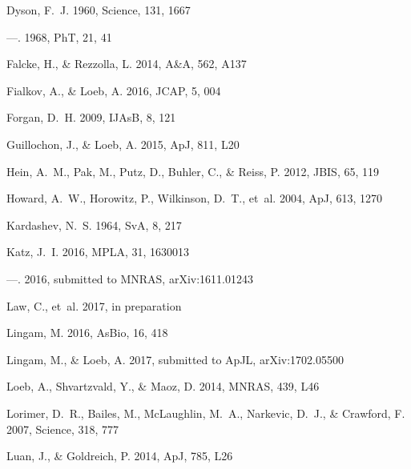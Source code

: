 \documentclass[twocolumn,tighten]{aastex61}
\begin{document}
\begin{thebibliography}{}
{Dyson}, F.~J. 1960, Science, 131, 1667

---. 1968, PhT, 21, 41

{Falcke}, H., \& {Rezzolla}, L. 2014, A\&A, 562, A137

{Fialkov}, A., \& {Loeb}, A. 2016, JCAP, 5, 004

{Forgan}, D.~H. 2009, IJAsB, 8, 121

{Guillochon}, J., \& {Loeb}, A. 2015, ApJ, 811, L20

{Hein}, A.~M., {Pak}, M., {Putz}, D., {Buhler}, C., \& {Reiss}, P. 2012, JBIS,
  65, 119

{Howard}, A.~W., {Horowitz}, P., {Wilkinson}, D.~T., {et~al.} 2004, ApJ, 613,
  1270

{Kardashev}, N.~S. 1964, SvA, 8, 217

{Katz}, J.~I. 2016{}, MPLA, 31, 1630013

---. 2016{}, submitted to MNRAS, arXiv:1611.01243

{Law}, C., {et~al.} 2017, in preparation

{Lingam}, M. 2016, AsBio, 16, 418

{Lingam}, M., \& {Loeb}, A. 2017, submitted to ApJL, arXiv:1702.05500

{Loeb}, A., {Shvartzvald}, Y., \& {Maoz}, D. 2014, MNRAS, 439, L46

{Lorimer}, D.~R., {Bailes}, M., {McLaughlin}, M.~A., {Narkevic}, D.~J., \&
  {Crawford}, F. 2007, Science, 318, 777

{Luan}, J., \& {Goldreich}, P. 2014, ApJ, 785, L26


\end{thebibliography}
\end{document}
